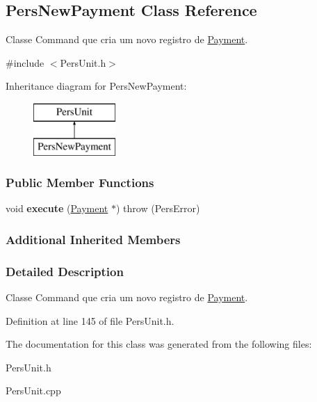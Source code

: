 \hypertarget{classPersNewPayment}{\subsection{Pers\-New\-Payment Class Reference}
\label{d5/d21/classPersNewPayment}
}


Classe Command que cria um novo registro de \hyperlink{classPayment}{Payment}.  




{\ttfamily \#include $<$Pers\-Unit.\-h$>$}

Inheritance diagram for Pers\-New\-Payment\-:\begin{figure}[H]
\begin{center}
\leavevmode
\includegraphics[height=2.000000cm]{d5/d21/classPersNewPayment}
\end{center}
\end{figure}
\subsubsection*{Public Member Functions}
\begin{DoxyCompactItemize}
\item 
\hypertarget{classPersNewPayment_adb33b781580bd87c025d15cdaeafb2f6}{void {\bfseries execute} (\hyperlink{classPayment}{Payment} $\ast$)  throw (\-Pers\-Error)}\label{d5/d21/classPersNewPayment_adb33b781580bd87c025d15cdaeafb2f6}

\end{DoxyCompactItemize}
\subsubsection*{Additional Inherited Members}


\subsubsection{Detailed Description}
Classe Command que cria um novo registro de \hyperlink{classPayment}{Payment}. 

Definition at line 145 of file Pers\-Unit.\-h.



The documentation for this class was generated from the following files\-:\begin{DoxyCompactItemize}
\item 
Pers\-Unit.\-h\item 
Pers\-Unit.\-cpp\end{DoxyCompactItemize}
